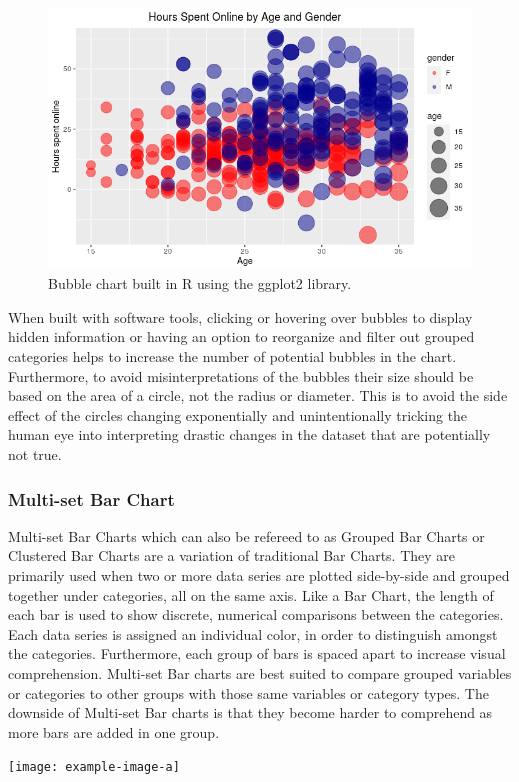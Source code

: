 \begin{figure}[H]
    \centering
        \includegraphics[scale=0.4]{figures/bubble_chart.png}
    \caption{Bubble chart built in R using the ggplot2 library.}
    \label{figure:bubble_chart}
\end{figure} 

When built with software 
tools, clicking or hovering over bubbles to display hidden information or having 
an option to reorganize and filter out grouped categories helps to increase the 
number of potential bubbles in the chart. Furthermore, to avoid misinterpretations 
of the bubbles their size should be based on the area of a circle, not the radius 
or diameter. This is to avoid the side effect of the circles changing exponentially 
and unintentionally tricking the human eye into interpreting drastic changes in 
the dataset that are potentially not true.

\subsubsection{Multi-set Bar Chart}
Multi-set Bar Charts which can also be refereed to as Grouped Bar Charts or Clustered 
Bar Charts are a variation of traditional Bar Charts. They are primarily used when 
two or more data series are plotted side-by-side and grouped together under categories, 
all on the same axis. Like a Bar Chart, the length of each bar is used to show 
discrete, numerical comparisons between the categories. Each data series is assigned 
an individual color, in order to distinguish amongst the categories. Furthermore, 
each group of bars is spaced apart to increase visual comprehension. Multi-set 
Bar charts are best suited to compare grouped variables or categories to other 
groups with those same variables or category types. The downside of Multi-set Bar 
charts is that they become harder to comprehend as more bars are added in one 
group.

\texttt{[image: example-image-a]} 